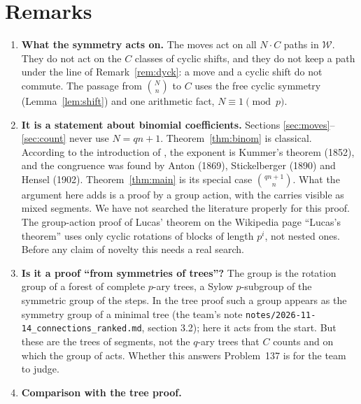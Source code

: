 \documentclass[11pt]{article}
\theoremstyle{definition}
\theoremstyle{remark}
\newcommand{\W}{\mathcal{W}}
\begin{document}
\section{Remarks}\label{sec:remarks}

\begin{enumerate}[leftmargin=*,itemsep=4pt]
\item \textbf{What the symmetry acts on.} The moves act on all $N\cdot C$ paths in $\W$. They do not act on the $C$
classes of cyclic shifts, and they do not keep a path under the line of Remark~\ref{rem:dyck}: a move and a cyclic
shift do not commute. The passage from $\binom Nn$ to $C$ uses the free cyclic symmetry (Lemma~\ref{lem:shift}) and
one arithmetic fact, $N\equiv1\pmod p$.

\item \textbf{It is a statement about binomial coefficients.} Sections \ref{sec:moves}--\ref{sec:count} never use
$N=qn+1$. Theorem~\ref{thm:binom} is classical. According to the introduction of \cite{G}, the exponent is Kummer's theorem
(1852), and the congruence was found by Anton (1869), Stickelberger (1890) and Hensel (1902). Theorem~\ref{thm:main} is
its special case $\binom{qn+1}n$. What the argument here adds is a proof by a group action, with the carries
visible as mixed segments. We have not searched the literature properly for this proof. The group-action proof of
Lucas' theorem on the Wikipedia page ``Lucas's theorem'' uses only cyclic rotations of blocks of length $p^i$, not nested ones.
Before any claim of novelty this needs a real search.

\item \textbf{Is it a proof ``from symmetries of trees''?} The group is the rotation group of a forest of
complete $p$-ary trees, a Sylow $p$-subgroup of the symmetric group of the steps. In the tree proof such a group
appears as the symmetry group of a minimal tree (the team's note \texttt{notes/2026-11-14\_connections\_ranked.md},
section 3.2); here it acts from the start. But these are the trees of segments, not the $q$-ary trees that $C$ counts
and on which the group of \cite{K} acts. Whether this answers Problem~137 is for the team to judge.

\item \textbf{Comparison with the tree proof.}\nopagebreak[4]


\end{enumerate}
\end{document}
